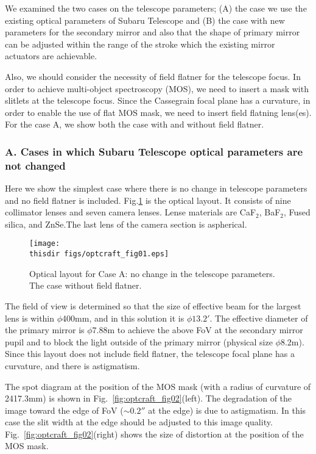We examined the two cases on the telescope parameters; (A) the case we
use the existing optical parameters of Subaru Telescope and (B) the case
with new parameters for the secondary mirror and also that the shape of 
primary mirror can be adjusted within the range of the stroke which the
existing mirror actuators are achievable.

Also, we should consider the necessity of field flatner for the
telescope focus. In order to achieve multi-object spectroscopy (MOS), we
need to insert a mask with slitlets at the telescope focus. Since the
Cassegrain focal plane has a curvature, in order to enable the use of
flat MOS mask, we need to insert field flatning lens(es). For the case
A, we show both the case with and without field flatner.

\subsubsection{A. Cases in which Subaru Telescope optical parameters are
   not changed}

Here we show the simplest case where there is no change in telescope
parameters and no field flatner is included.
Fig.\ref{fig:optcraft_fig01} is the optical layout. It consists of nine
collimator lenses and seven camera lenses. Lense materials are CaF$_2$, 
BaF$_2$, Fused silica, and ZnSe.The last lens of the camera section is
aspherical. 

\begin{figure}[!ht]
\centerline{
\texttt{[image: \\thisdir figs/optcraft\_fig01.eps]}
}
\caption{Optical layout for Case A: no change in the telescope
 parameters. The case without field flatner.
}
\label{fig:optcraft_fig01}
\end{figure}

The field of view is determined so that the size of effective beam for
the largest lens is within $\phi$400mm, and in this solution it is 
$\phi 13.2'$. The effective diameter of the primary mirror is 
$\phi 7.88$m to achieve the above FoV at the secondary mirror pupil and
to block the light outside of the primary mirror (physical size 
$\phi$8.2m). Since this layout does not include field flatner, the
telescope focal plane has a curvature, and there is astigmatism.

The spot diagram at the position of the MOS mask (with a radius of
curvature of 2417.3mm) is shown in
Fig.~\ref{fig:optcraft_fig02}(left). The degradation of the image toward
the edge of FoV ($\sim 0.2''$ at the edge) is due to astigmatism. 
In this case the slit width at the edge should be adjusted to this image
quality. 
Fig.~\ref{fig:optcraft_fig02}(right) shows the size of distortion at the
position of the MOS mask.

